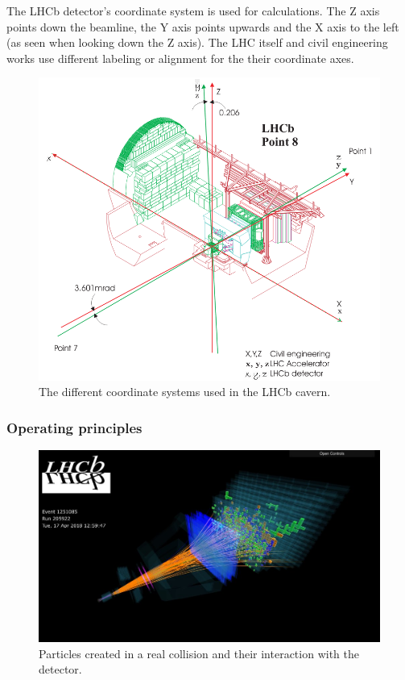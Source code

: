 \documentclass[12pt]{article}
\begin{document}
The LHCb detector's coordinate system is used for calculations. The Z axis points down the beamline, the Y axis points upwards and the X axis to the left (as seen when looking down the Z axis). The LHC itself and civil engineering works use different labeling or alignment for the their coordinate axes.

\begin{figure}[H]
	\includegraphics[width=\textwidth]{intro_lhcb_coordinate_systems}
	\caption{The different coordinate systems used in the LHCb cavern. \cite{lhcb_coordinate_systems}}
	\label{fig_lhcb_coordinate_systems}
\end{figure}


\subsubsection{Operating principles}\label{sec_lhcb_det_theory}

\begin{figure}[H]
	\includegraphics[width=\textwidth]{lbevent_collision_example}
	\caption{Particles created in a real collision and their interaction with the detector. \cite{lb_event_display}}
	\label{fig_lhcb_lbevent_collision}
\end{figure}
\end{document}
